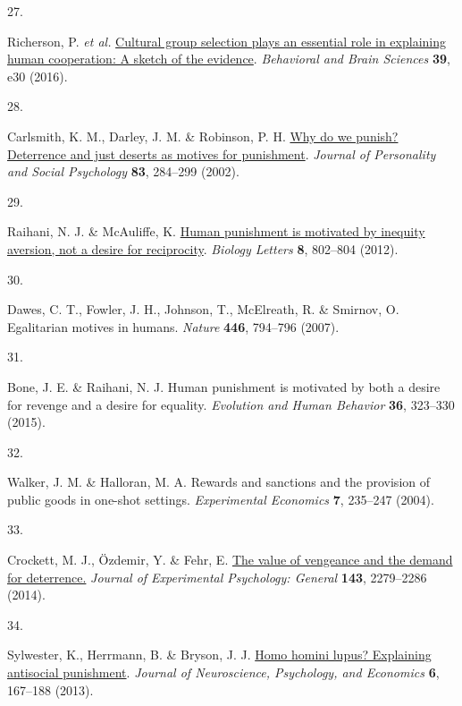 \documentclass[
  man,floatsintext]{apa6}
\newlength{\cslhangindent}
\newlength{\csllabelwidth}
\newlength{\cslentryspacingunit} %
\newenvironment{CSLReferences}[2] %
 {%
  \setlength{\parindent}{0pt}
  \ifodd #1
  \let\oldpar\par
  \def\par{\hangindent=\cslhangindent\oldpar}
  \fi
  \setlength{\parskip}{#2\cslentryspacingunit}
 }%
 {}
\newcommand{\CSLLeftMargin}[1]{\parbox[t]{\csllabelwidth}{#1}}
\newcommand{\CSLRightInline}[1]{\parbox[t]{\linewidth - \csllabelwidth}{#1}\break}
\begin{document}
\begin{CSLReferences}{0}{0}
\leavevmode{}%
\CSLLeftMargin{27. }%
\CSLRightInline{Richerson, P. \emph{et al.} \href{https://doi.org/10.1017/S0140525X1400106X}{Cultural group selection plays an essential role in explaining human cooperation: A sketch of the evidence}. \emph{Behavioral and Brain Sciences} \textbf{39}, e30 (2016).}

\leavevmode{}%
\CSLLeftMargin{28. }%
\CSLRightInline{Carlsmith, K. M., Darley, J. M. \& Robinson, P. H. \href{https://doi.org/10.1037/0022-3514.83.2.284}{Why do we punish? Deterrence and just deserts as motives for punishment}. \emph{Journal of Personality and Social Psychology} \textbf{83}, 284--299 (2002).}

\leavevmode{}%
\CSLLeftMargin{29. }%
\CSLRightInline{Raihani, N. J. \& McAuliffe, K. \href{https://doi.org/10.1098/rsbl.2012.0470}{Human punishment is motivated by inequity aversion, not a desire for reciprocity}. \emph{Biology Letters} \textbf{8}, 802--804 (2012).}

\leavevmode{}%
\CSLLeftMargin{30. }%
\CSLRightInline{Dawes, C. T., Fowler, J. H., Johnson, T., McElreath, R. \& Smirnov, O. Egalitarian motives in humans. \emph{Nature} \textbf{446}, 794--796 (2007).}

\leavevmode{}%
\CSLLeftMargin{31. }%
\CSLRightInline{Bone, J. E. \& Raihani, N. J. Human punishment is motivated by both a desire for revenge and a desire for equality. \emph{Evolution and Human Behavior} \textbf{36}, 323--330 (2015).}

\leavevmode{}%
\CSLLeftMargin{32. }%
\CSLRightInline{Walker, J. M. \& Halloran, M. A. Rewards and sanctions and the provision of public goods in one-shot settings. \emph{Experimental Economics} \textbf{7}, 235--247 (2004).}

\leavevmode{}%
\CSLLeftMargin{33. }%
\CSLRightInline{Crockett, M. J., Özdemir, Y. \& Fehr, E. \href{https://doi.org/10.1037/xge0000018}{The value of vengeance and the demand for deterrence.} \emph{Journal of Experimental Psychology: General} \textbf{143}, 2279--2286 (2014).}

\leavevmode{}%
\CSLLeftMargin{34. }%
\CSLRightInline{Sylwester, K., Herrmann, B. \& Bryson, J. J. \href{https://doi.org/10.1037/npe0000009}{Homo homini lupus? Explaining antisocial punishment}. \emph{Journal of Neuroscience, Psychology, and Economics} \textbf{6}, 167--188 (2013).}


\end{CSLReferences}
\end{document}
